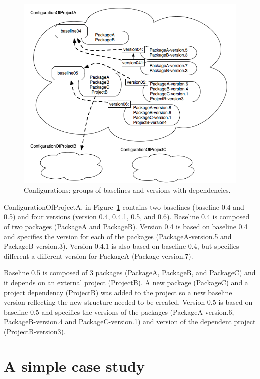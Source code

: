 \documentclass[a4paper,10pt,twoside]{book}
\begin{document}
\begin{figure}
\begin{center}
\includegraphics[width=\linewidth]{configurations}
\caption{Configurations: groups of baselines and versions with dependencies.\label{configurations}}
\end{center}
\end{figure}


ConfigurationOfProjectA, in Figure~\ref{configurations} contains two baselines (baseline 0.4 and 0.5) and four versions (version 0.4, 0.4.1, 0.5, and 0.6). Baseline 0.4 is composed of two packages (PackageA and PackageB). Version 0.4 is based on baseline 0.4 and specifies the version for each of the packages (PackageA-version.5 and PackageB-version.3). Version 0.4.1 is also based on baseline 0.4, but specifies different a different version for PackageA (Package-version.7).

Baseline 0.5 is composed of 3 packages (PackageA, PackageB, and PackageC) and it depends on an external project (ProjectB). A new package (PackageC) and a project dependency (ProjectB) was added to the project so a new baseline version reflecting the new structure needed to be created. Version 0.5 is based on baseline 0.5 and specifies the versions of the packages (PackageA-version.6, PackageB-version.4 and PackageC-version.1) and version of the dependent project (ProjectB-version3).



\section{A simple case study}
\end{document}

